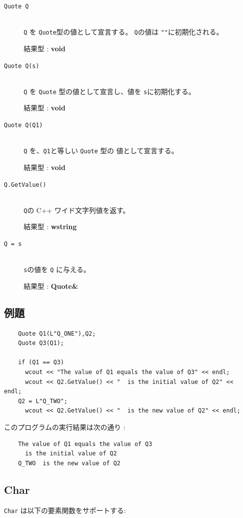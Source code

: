 \documentclass[\pformat,12pt]{jarticle}
\begin{document}
\begin{description}
\item[{\tt Quote Q}] \mbox{}\\
      {\tt Q} を {\tt Quote}型の値として宣言する。 {\tt Q}の値は {\tt ""}に初期化される。

     結果型 : {\bf void}

\item[{\tt Quote Q(s)}] \mbox{}\\
      {\tt Q} を {\tt Quote} 型の値として宣言し、値を {\tt s}に初期化する。

     結果型 : {\bf void}

\item[{\tt Quote Q(Q1)}] \mbox{}\\
      {\tt Q} を、{\tt Q1}と等しい {\tt Quote} 型の 値として宣言する。

     結果型 : {\bf void}

\item[{\tt Q.GetValue()}] \mbox{}\\
      {\tt Q}の C++ ワイド文字列値を返す。

     結果型 : {\bf wstring}

\item[{\tt Q = s}] \mbox{}\\
      {\tt s}の値を {\tt Q} に与える。

     結果型 : {\bf Quote\&}
\end{description}

\subsection*{例題}

\begin{verbatim}
    Quote Q1(L"Q_ONE"),Q2;
    Quote Q3(Q1);

    if (Q1 == Q3)
      wcout << "The value of Q1 equals the value of Q3" << endl;
      wcout << Q2.GetValue() << "  is the initial value of Q2" << endl;
    Q2 = L"Q_TWO";
      wcout << Q2.GetValue() << "  is the new value of Q2" << endl;
\end{verbatim}

\noindent このプログラムの実行結果は次の通り :

\begin{verbatim}
    The value of Q1 equals the value of Q3
      is the initial value of Q2
    Q_TWO  is the new value of Q2
\end{verbatim}


\subsection{Char}
{\tt Char} は以下の要素関数をサポートする:
\end{document}
